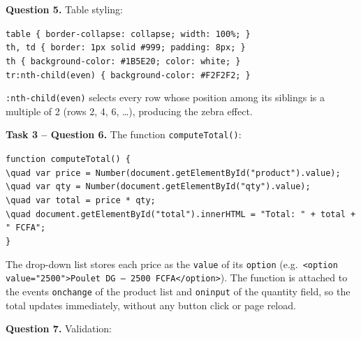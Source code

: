 \documentclass[11pt]{article}
\begin{document}
\textbf{Question 5.} Table styling:

\begin{center}
\texttt{table \{ border-collapse: collapse; width: 100\%; \}}\\
\texttt{th, td \{ border: 1px solid \#999; padding: 8px; \}}\\
\texttt{th \{ background-color: \#1B5E20; color: white; \}}\\
\texttt{tr:nth-child(even) \{ background-color: \#F2F2F2; \}}
\end{center}

\texttt{:nth-child(even)} selects every row whose position among its siblings is a multiple of 2 (rows 2, 4, 6, \ldots), producing the zebra effect.

\textbf{Task 3 -- Question 6.} The function \texttt{computeTotal()}:

\begin{center}
\texttt{function computeTotal() \{}\\
\texttt{\textbackslash{}quad var price = Number(document.getElementById("product").value);}\\
\texttt{\textbackslash{}quad var qty = Number(document.getElementById("qty").value);}\\
\texttt{\textbackslash{}quad var total = price * qty;}\\
\texttt{\textbackslash{}quad document.getElementById("total").innerHTML = "Total: " + total + " FCFA";}\\
\texttt{\}}
\end{center}

The drop-down list stores each price as the \texttt{value} of its \texttt{option} (e.g.\ \texttt{<option value="2500">Poulet DG -- 2500 FCFA</option>}). The function is attached to the events \texttt{onchange} of the product list and \texttt{oninput} of the quantity field, so the total updates immediately, without any button click or page reload.

\textbf{Question 7.} Validation:
\end{document}
